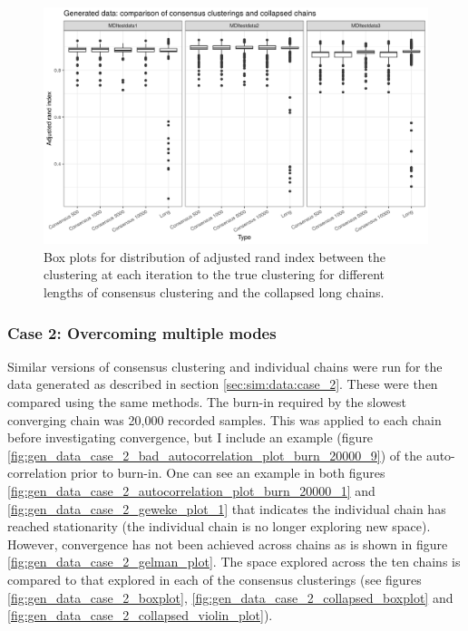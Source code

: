 \documentclass[12pt]{article} %
\begin{document}
		
		\begin{figure}[!htb]
			\centering
			\includegraphics[scale=0.65]{Images/Gen_data/Case_1/box_plot_ari_true_clustering_collapsed_long.png}
			\caption{Box plots for distribution of adjusted rand index between the clustering at each iteration to the true clustering for different lengths of consensus clustering and the collapsed long chains.}
			\label{fig:gen_data_case_1_collapsed_boxplot}
		\end{figure}
		

	
	\subsubsection{Case 2: Overcoming multiple modes} \label{sec:results:case_2}
	Similar versions of consensus clustering and individual chains were run for the data generated as described in section \ref{sec:sim:data:case_2}. These were then compared using the same methods. The burn-in required by the slowest converging chain was 20,000 recorded samples. This was applied to each chain before investigating convergence, but I include an example (figure \ref{fig:gen_data_case_2_bad_autocorrelation_plot_burn_20000_9}) of the auto-correlation prior to burn-in. One can see an example in both figures \ref{fig:gen_data_case_2_autocorrelation_plot_burn_20000_1} and \ref{fig:gen_data_case_2_geweke_plot_1} that indicates the individual chain has reached stationarity (the individual chain is no longer exploring new space). However, convergence has not been achieved across chains as is shown in figure \ref{fig:gen_data_case_2_gelman_plot}. The space explored across the ten chains is compared to that explored in each of the consensus clusterings (see figures \ref{fig:gen_data_case_2_boxplot}, \ref{fig:gen_data_case_2_collapsed_boxplot} and \ref{fig:gen_data_case_2_collapsed_violin_plot}).
	
\end{document}
